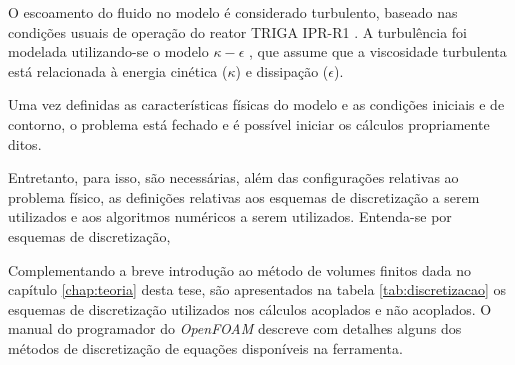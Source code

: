 O escoamento do fluido no modelo é considerado turbulento, baseado nas condições usuais de operação
do reator TRIGA IPR-R1 \cite{Veloso2005}. A turbulência foi modelada utilizando-se o modelo
$\kappa-\epsilon$ \cite{Launder1974}, que assume que a viscosidade turbulenta está relacionada
à energia cinética ($\kappa$) e dissipação ($\epsilon$).

Uma vez definidas as características físicas do modelo e as condições iniciais e de contorno,
o problema está fechado e é possível iniciar os cálculos propriamente ditos.

Entretanto, para isso, são necessárias, além das configurações relativas
ao problema físico, as definições relativas aos esquemas de discretização a serem utilizados e aos
algoritmos numéricos a serem utilizados. Entenda-se por esquemas de discretização, 

Complementando a breve introdução ao método de volumes finitos
dada no capítulo \ref{chap:teoria} desta tese, são apresentados na tabela \ref{tab:discretizacao}
os esquemas de discretização utilizados nos cálculos acoplados e não acoplados. O manual
do programador do \textit{OpenFOAM} \cite[Seção 2.4]{OpenFOAM2015b} descreve com detalhes alguns
dos métodos de discretização de equações disponíveis na ferramenta.


